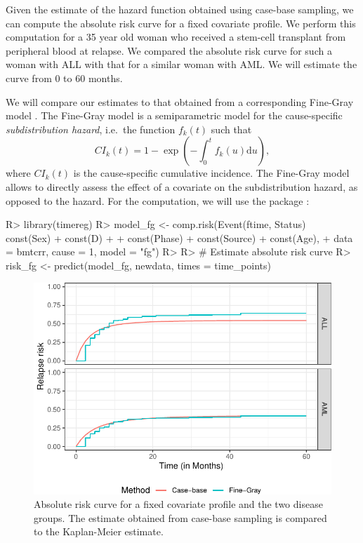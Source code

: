 \documentclass[
]{jss}
\begin{document}
Given the estimate of the hazard function obtained using case-base
sampling, we can compute the absolute risk curve for a fixed covariate
profile. We perform this computation for a 35 year old woman who
received a stem-cell transplant from peripheral blood at relapse. We
compared the absolute risk curve for such a woman with ALL with that for
a similar woman with AML. We will estimate the curve from 0 to 60
months.

We will compare our estimates to that obtained from a corresponding
Fine-Gray model \citeyearpar{fine1999proportional}. The Fine-Gray model
is a semiparametric model for the cause-specific \emph{subdistribution
hazard}, i.e.~the function \(f_k(t)\) such that
\[CI_k(t) =1 - \exp\left( - \int_0^t f_k(u) \textrm{d}u \right),\] where
\(CI_k(t)\) is the cause-specific cumulative incidence. The Fine-Gray
model allows to directly assess the effect of a covariate on the
subdistribution hazard, as opposed to the hazard. For the computation,
we will use the  package \citep{timereg}:

\begin{CodeChunk}

\begin{CodeInput}
R> library(timereg)
R> model_fg <- comp.risk(Event(ftime, Status) ~ const(Sex) + const(D) +
+                         const(Phase) + const(Source) + const(Age),
+                       data = bmtcrr, cause = 1, model = "fg")
R> 
R> # Estimate absolute risk curve
R> risk_fg <- predict(model_fg, newdata, times = time_points)
\end{CodeInput}
\end{CodeChunk}

\begin{CodeChunk}
\begin{figure}[ht]

{\centering \includegraphics[width=\textwidth,keepaspectratio=true]{../figures/bmtcrr-risk-1} 

}

\caption{\label{fig:compAbsrisk} Absolute risk curve for a fixed covariate profile and the two disease groups. The estimate obtained from case-base sampling is compared to the Kaplan-Meier estimate.}\label{fig:bmtcrr-risk}
\end{figure}
\end{CodeChunk}
\end{document}
